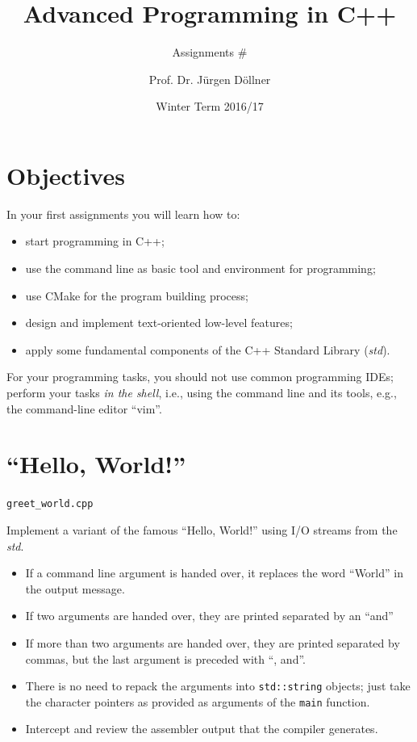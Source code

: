 \documentclass{cgsblatt}
\title{Advanced Programming in C++}
\subtitle{Assignments \# \theexercise}
\date{Winter Term 2016/17}
\author{Prof. Dr. Jürgen Döllner}
\begin{document}
\maketitle

\section*{Objectives}
In your first assignments you will learn how to:
\begin{itemize}
\setlength{\parskip}{0pt}
\item start programming in C++;
\item use the command line as basic tool and environment for programming;
\item use CMake for the program building process;
\item design and implement text-oriented low-level features;
\item apply some fundamental components of the C++ Standard Library (\emph{std}).
\end{itemize}

For your programming tasks, you should not use common programming IDEs; 
perform your tasks \emph{in the shell}, i.e., using the command line and its tools, 
e.g., the command-line editor \enquote{vim}.


\section{\enquote{Hello, World!}}

\lstinline|greet_world.cpp|

Implement a variant of the famous \enquote{Hello, World!}
using I/O streams from the \emph{std}.

\begin{itemize}\setlength{\parskip}{4pt}

    \item If a command line argument is handed over, 
    it replaces the word \enquote{World} in the output message. 
    \item If two arguments are handed over, they are printed separated by an \enquote{and}
    \item If more than two arguments are handed over, 
    they are printed separated by commas,
    but the last argument is preceded with \enquote{, and}.
    \item There is no need to repack the arguments into \lstinline|std::string| objects; 
    just take the character pointers as provided as arguments of the \lstinline|main| function. 
    \item Intercept and review the assembler output that the compiler generates. 

\end{itemize} 
\end{document}
